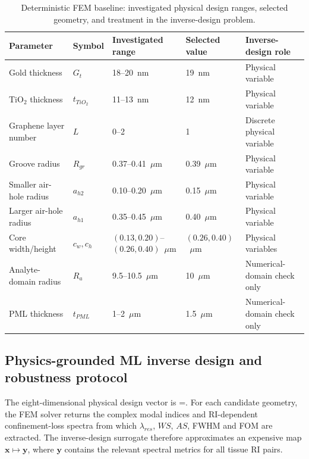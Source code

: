 \documentclass[5p,times,twocolumn]{elsarticle}
\def\mathrm#1{#1}%
\let\oldequation\equation
\let\oldendequation\endequation
\renewenvironment{equation}
  {\linenomathNonumbers\oldequation}
  {\oldendequation\endlinenomath}
\begin{document}
\begin{table}[!t]
\caption{Deterministic FEM baseline: investigated physical design ranges, selected geometry, and treatment in the inverse-design problem.}
\centering
\small
\begin{tabularx}{\textwidth}{p{} p{} p{} p{} X}
\toprule
\textbf{Parameter} & \textbf{Symbol} & \textbf{Investigated range} & \textbf{Selected value} & \textbf{Inverse-design role} \\
\midrule
Gold thickness & $G_t$ & 18--20~nm & 19~nm & Physical variable \\
TiO$_2$ thickness & $t_{\mathrm{TiO_2}}$ & 11--13~nm & 12~nm & Physical variable \\
Graphene layer number & $L$ & 0--2 & 1 & Discrete physical variable \\
Groove radius & $R_{gr}$ & 0.37--0.41~$\mu$m & 0.39~$\mu$m & Physical variable \\
Smaller air-hole radius & $a_{h2}$ & 0.10--0.20~$\mu$m & 0.15~$\mu$m & Physical variable \\
Larger air-hole radius & $a_{h1}$ & 0.35--0.45~$\mu$m & 0.40~$\mu$m & Physical variable \\
Core width/height & $c_w,c_h$ & $(0.13,0.20)$--$(0.26,0.40)$~$\mu$m & $(0.26,0.40)$~$\mu$m & Physical variables \\
Analyte-domain radius & $R_a$ & 9.5--10.5~$\mu$m & 10~$\mu$m & Numerical-domain check only \\
PML thickness & $t_{\mathrm{PML}}$ & 1--2~$\mu$m & 1.5~$\mu$m & Numerical-domain check only \\
\bottomrule
\end{tabularx}
\label{table:optimized_parameters}
\end{table}

\subsection{Physics-grounded ML inverse design and robustness protocol}
\label{subsec:ml_inverse_optimization}

The eight-dimensional physical design vector is
\begin{equation}
=\left[G_t,t_{\mathrm{TiO_2}},L,R_{gr},a_{h1},a_{h2},c_w,c_h\right].
\label{eq:ml_design_vector}
\end{equation}
For each candidate geometry, the FEM solver returns the complex modal indices and RI-dependent confinement-loss spectra from which $\lambda_{\mathrm{res}}$, $WS$, $AS$, FWHM and FOM are extracted. The inverse-design surrogate therefore approximates an expensive map $\mathbf{x}\mapsto\mathbf{y}$, where $\mathbf{y}$ contains the relevant spectral metrics for all tissue RI pairs.
\end{document}
